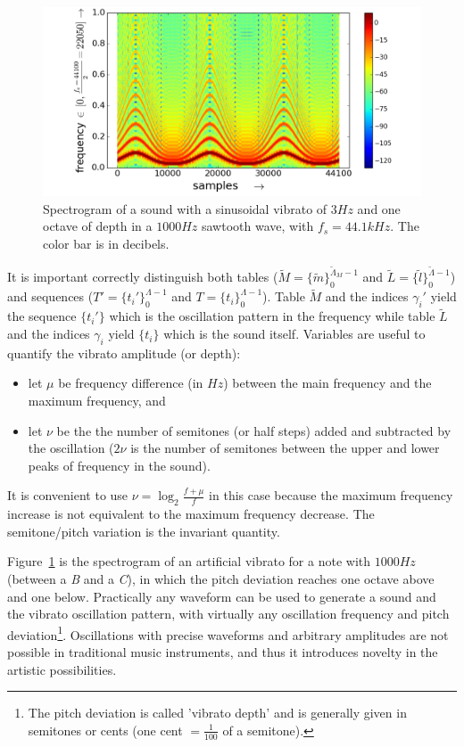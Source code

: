 \begin{figure}[h!]
     \centering
         \includegraphics[width=\columnwidth]{figures/vibrato_}
     \caption{Spectrogram of a sound with a sinusoidal vibrato of $3Hz$ and one octave of depth in a $1000Hz$ sawtooth wave, with $f_s=44.1kHz$. The color bar is in decibels.}
         \label{fig:vibrato}
\end{figure}

It is important correctly distinguish both tables 
($\widetilde{M}=\{\widetilde{m}\}_0^{\widetilde{\Lambda}_M-1}$ and $\widetilde{L}=\{\widetilde{l}\}_0^{\widetilde{\Lambda}-1}$)
and sequences ($T'=\{t_i'\}_0^{\Lambda-1}$ and $T=\{t_i\}_0^{\Lambda-1}$).
Table $\widetilde{M}$ and the indices $\gamma_i'$ yield the sequence $\{t_i'\}$
which is the oscillation pattern in the frequency while table $\widetilde{L}$ and the indices $\gamma_i$
yield $\{t_i\}$ which is the sound itself.
Variables are useful to quantify the vibrato amplitude (or depth):
\begin{itemize}
	\item let $\mu$ be frequency difference (in $Hz$) between the main frequency and the maximum frequency, and
    \item let $\nu$ be the the number of semitones (or half steps) added and subtracted by the oscillation ($2\nu$ is the number of semitones between the upper and lower peaks of frequency in the sound).
\end{itemize}

It is convenient to use $\nu=\log_{2}\frac{f+\mu}{f} $ in this case because the maximum frequency increase is not equivalent to the maximum frequency decrease. The semitone/pitch variation is the invariant quantity.

Figure~\ref{fig:vibrato} is the spectrogram of an artificial vibrato for a note with $1000Hz$ (between a \emph{B} and a \emph{C}),
in which the pitch deviation reaches one octave above and one below.
Practically any waveform can be used to generate a sound and the vibrato oscillation pattern, with virtually any oscillation frequency and pitch deviation\footnote{The pitch deviation is called 'vibrato depth' and is generally given in semitones or cents (one cent $= \frac{1}{100}$ of a semitone).}.
Oscillations with precise waveforms and arbitrary amplitudes are not possible in traditional music instruments, and thus it introduces novelty in the artistic possibilities.

